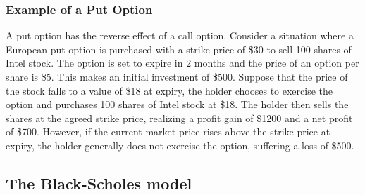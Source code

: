 \subsubsection{Example of a Put Option}
A put option has the reverse effect of a call option. Consider a situation where a European put option is purchased with a strike price of
\$30 to sell 100 shares of Intel stock. The option is set to expire in 2 months and the price of an option per share is \$5. This makes an initial
investment of \$500. Suppose that the price of the stock falls to a value of \$18 at expiry, the holder chooses to exercise the option and purchases 100
shares of Intel stock at \$18. The holder then sells the shares at the agreed strike price, realizing a profit gain of \$1200 and a net profit of \$700.
However, if the current market price rises above the strike price at expiry, the holder generally does not exercise the option, suffering a loss 
of \$500.

\subsection{The Black-Scholes model}